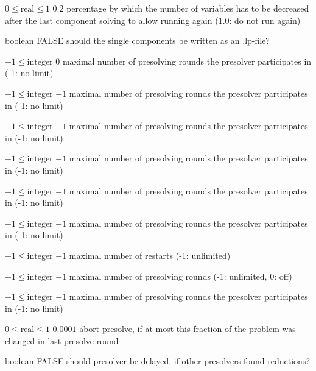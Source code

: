 %
{$0\leq\textrm{real}\leq1$}%
{$0.2$}%
{percentage by which the number of variables has to be decreased after the last component solving to allow running again (1.0: do not run again)}%
{}

%
{boolean}%
{FALSE}%
{should the single components be written as an .lp-file?}%
{}

%
{$-1\leq\textrm{integer}$}%
{$0$}%
{maximal number of presolving rounds the presolver participates in (-1: no limit)}%
{}

%
{$-1\leq\textrm{integer}$}%
{$-1$}%
{maximal number of presolving rounds the presolver participates in (-1: no limit)}%
{}

%
{$-1\leq\textrm{integer}$}%
{$-1$}%
{maximal number of presolving rounds the presolver participates in (-1: no limit)}%
{}

%
{$-1\leq\textrm{integer}$}%
{$-1$}%
{maximal number of presolving rounds the presolver participates in (-1: no limit)}%
{}

%
{$-1\leq\textrm{integer}$}%
{$-1$}%
{maximal number of presolving rounds the presolver participates in (-1: no limit)}%
{}

%
{$-1\leq\textrm{integer}$}%
{$-1$}%
{maximal number of presolving rounds the presolver participates in (-1: no limit)}%
{}

%
{$-1\leq\textrm{integer}$}%
{$-1$}%
{maximal number of restarts (-1: unlimited)}%
{}

%
{$-1\leq\textrm{integer}$}%
{$-1$}%
{maximal number of presolving rounds (-1: unlimited, 0: off)}%
{}

%
{$-1\leq\textrm{integer}$}%
{$-1$}%
{maximal number of presolving rounds the presolver participates in (-1: no limit)}%
{}

%
{$0\leq\textrm{real}\leq1$}%
{$0.0001$}%
{abort presolve, if at most this fraction of the problem was changed in last presolve round}%
{}

%
{boolean}%
{FALSE}%
{should presolver be delayed, if other presolvers found reductions?}%
{}

